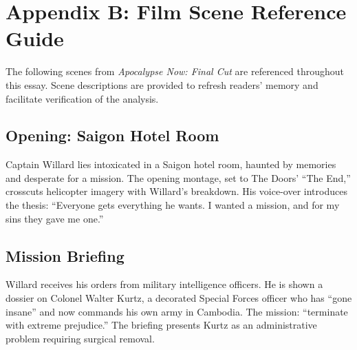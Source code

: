 \section*{Appendix B: Film Scene Reference Guide}
\label{app:scene-reference}

The following scenes from \textit{Apocalypse Now: Final Cut} \parencite{CoppolaApocalypse2019}
are referenced throughout this essay. Scene descriptions are provided to refresh readers'
memory and facilitate verification of the analysis.

\begin{minipage}{\textwidth}
	\subsection*{Opening: Saigon Hotel Room}
	\label{scene:saigon-opening}

	Captain Willard lies intoxicated in a Saigon hotel room, haunted by memories and desperate for
	a mission. The opening montage, set to The Doors' ``The End,'' crosscuts helicopter imagery
	with Willard's breakdown. His voice-over introduces the thesis: ``Everyone gets everything he
	wants. I wanted a mission, and for my sins they gave me one.''
\end{minipage}

\begin{minipage}{\textwidth}
	\subsection*{Mission Briefing}
	\label{scene:briefing}

	Willard receives his orders from military intelligence officers. He is shown a dossier on
	Colonel Walter Kurtz, a decorated Special Forces officer who has ``gone insane'' and now
	commands his own army in Cambodia. The mission: ``terminate with extreme prejudice.'' The
	briefing presents Kurtz as an administrative problem requiring surgical removal.
\end{minipage}

